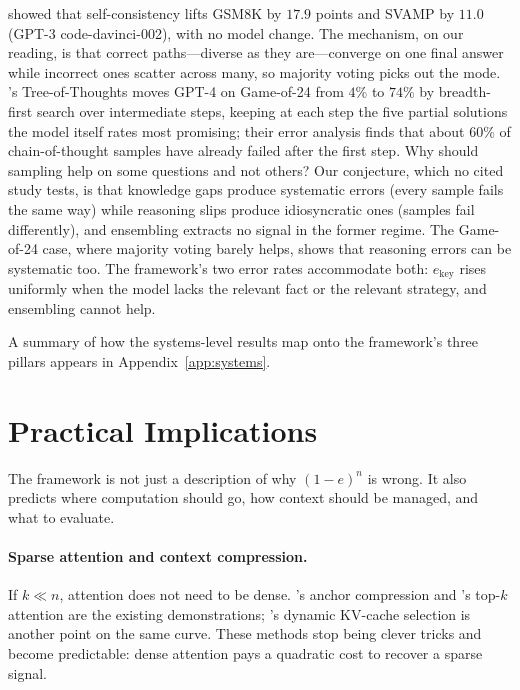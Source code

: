 \citet{wang2023self} showed that self-consistency lifts GSM8K by $17.9$ points and SVAMP by $11.0$ (GPT-3 code-davinci-002), with no model change. The mechanism, on our reading, is that correct paths---diverse as they are---converge on one final answer while incorrect ones scatter across many, so majority voting picks out the mode. \citet{yao2023tree}'s Tree-of-Thoughts moves GPT-4 on Game-of-24 from $4\%$ to $74\%$ by breadth-first search over intermediate steps, keeping at each step the five partial solutions the model itself rates most promising; their error analysis finds that about $60\%$ of chain-of-thought samples have already failed after the first step. Why should sampling help on some questions and not others? Our conjecture, which no cited study tests, is that knowledge gaps produce systematic errors (every sample fails the same way) while reasoning slips produce idiosyncratic ones (samples fail differently), and ensembling extracts no signal in the former regime. The Game-of-24 case, where majority voting barely helps, shows that reasoning errors can be systematic too. The framework's two error rates accommodate both: $e_{\text{key}}$ rises uniformly when the model lacks the relevant fact or the relevant strategy, and ensembling cannot help.

A summary of how the systems-level results map onto the framework's three pillars appears in Appendix~\ref{app:systems}.

\section{Practical Implications}
\label{sec:implications}

The framework is not just a description of why $(1-e)^n$ is wrong. It also predicts where computation should go, how context should be managed, and what to evaluate.

\paragraph{Sparse attention and context compression.}
If $k \ll n$, attention does not need to be dense. \citet{pang2024anchor}'s anchor compression and \citet{liu2024retrieval}'s top-$k$ attention are the existing demonstrations; \citet{wu2024tokenselect}'s dynamic KV-cache selection is another point on the same curve. These methods stop being clever tricks and become predictable: dense attention pays a quadratic cost to recover a sparse signal.

